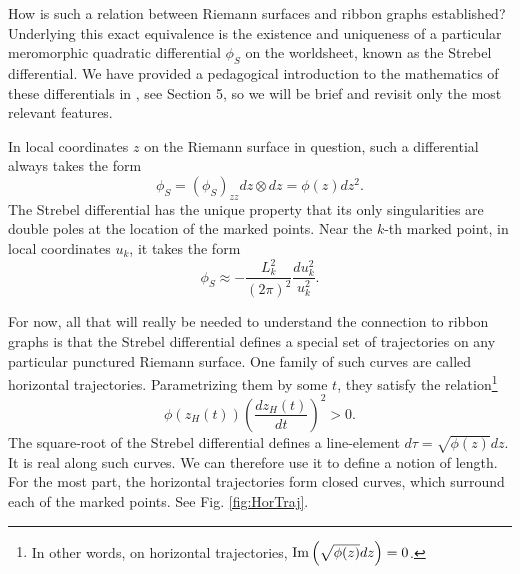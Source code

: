 \documentclass[english]{article}
\renewcommand{\>}{\rangle}
\newcommand{\<}{\langle}
\renewcommand{\(}{\left(}
\renewcommand{\)}{\right)}
\begin{document}
How is such a relation between Riemann surfaces and ribbon graphs established? Underlying this exact equivalence is the existence and uniqueness of a particular meromorphic quadratic differential $\phi_{S}$ on the worldsheet, known as the Strebel differential. We have provided a pedagogical introduction to the mathematics of these differentials in \cite{DSDI}, see Section 5, so we will be brief and revisit only the most relevant features. 

In local coordinates $z$ on the Riemann surface in question, such a differential always takes the form 
\begin{equation}
     \phi_{S} = \left( \phi_{S} \right)_{zz} dz \otimes dz = \phi(z) dz^2 . 
\end{equation}
The Strebel differential has the unique property that its only singularities are double poles at the location of the marked points. Near the $k$-th marked point, in local coordinates $u_k$, it takes the form
\begin{equation}
    \phi_{S}  \approx - \frac{L_{k}^2}{(2\pi)^2} \frac{du_{k}^2}{u_{k}^2} .\label{eq:StrebelNearPole}
\end{equation}


For now, all that will really be needed to understand the connection to ribbon graphs is that the Strebel differential defines a special set of trajectories on any particular punctured Riemann surface.
One family of such curves are called horizontal trajectories. Parametrizing them by some $t$, they satisfy the relation\footnote{In other words, on horizontal trajectories, ${\rm Im}\left(\sqrt{\phi(z)}dz\right)=0$.} 
\begin{equation}
    \phi\left(z_{H}(t)\right) \left( \frac{dz_{H}(t)}{dt} \right)^2 > 0. \label{eq:horizontal}
\end{equation}
The square-root of the Strebel differential defines a line-element $d\tau = \sqrt{\phi(z)} dz$. It is real along such curves. We can therefore use it to define a notion of length. For the most part, the horizontal trajectories form closed curves, which surround each of the marked points. See Fig. \ref{fig:HorTraj}. 
\end{document}
